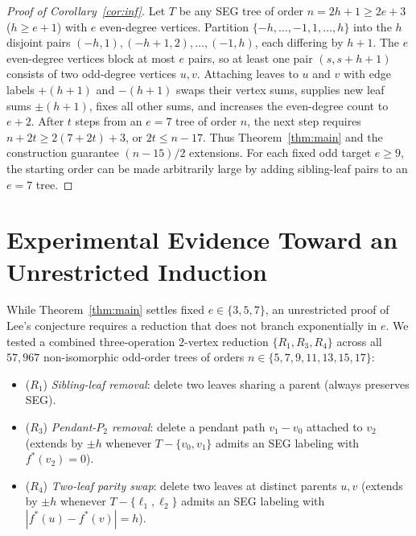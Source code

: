 \documentclass[11pt]{article}
\theoremstyle{definition}
\begin{document}
\begin{proof}[Proof of Corollary~\ref{cor:inf}]
Let $T$ be any SEG tree of order $n = 2h + 1 \ge 2e + 3$ ($h \ge e + 1$) with $e$ even-degree vertices. Partition $\{-h, \dots, -1, 1, \dots, h\}$ into the $h$ disjoint pairs $(-h, 1), (-h+1, 2), \dots, (-1, h)$, each differing by $h + 1$. The $e$ even-degree vertices block at most $e$ pairs, so at least one pair $(s, s + h + 1)$ consists of two odd-degree vertices $u, v$. Attaching leaves to $u$ and $v$ with edge labels $+(h+1)$ and $-(h+1)$ swaps their vertex sums, supplies new leaf sums $\pm(h+1)$, fixes all other sums, and increases the even-degree count to $e + 2$. After $t$ steps from an $e=7$ tree of order $n$, the next step requires $n+2t \ge 2(7+2t)+3$, or $2t \le n-17$. Thus Theorem~\ref{thm:main} and the construction guarantee $(n-15)/2$ extensions. For each fixed odd target $e\ge9$, the starting order can be made arbitrarily large by adding sibling-leaf pairs to an $e=7$ tree.
\end{proof}

\section{Experimental Evidence Toward an Unrestricted Induction}

While Theorem~\ref{thm:main} settles fixed $e \in \{3, 5, 7\}$, an unrestricted proof of Lee's conjecture requires a reduction that does not branch exponentially in $e$. We tested a combined three-operation $2$-vertex reduction $\{R_1, R_3, R_4\}$ across all $57{,}967$ non-isomorphic odd-order trees of orders $n \in \{5, 7, 9, 11, 13, 15, 17\}$:
\begin{itemize}
\item ($R_1$) \emph{Sibling-leaf removal}: delete two leaves sharing a parent (always preserves SEG).
\item ($R_3$) \emph{Pendant-$P_2$ removal}: delete a pendant path $v_1 - v_0$ attached to $v_2$ (extends by $\pm h$ whenever $T - \{v_0, v_1\}$ admits an SEG labeling with $f^*(v_2) = 0$).
\item ($R_4$) \emph{Two-leaf parity swap}: delete two leaves at distinct parents $u, v$ (extends by $\pm h$ whenever $T - \{\ell_1, \ell_2\}$ admits an SEG labeling with $|f^*(u) - f^*(v)| = h$).
\end{itemize}
\end{document}
